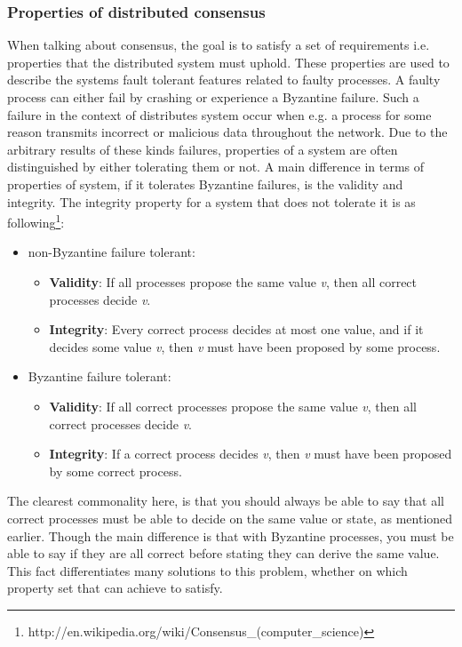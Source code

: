 \subsubsection{Properties of distributed consensus}
When talking about consensus, the goal is to satisfy a set of requirements i.e. properties that the distributed system must uphold. These properties are used to describe the systems fault tolerant features related to faulty processes. A faulty process can either fail by crashing or experience a Byzantine failure. Such a failure in the context of distributes system occur when e.g. a process for some reason transmits incorrect or malicious data throughout the network. Due to the arbitrary results of these kinds failures, properties of a system are often distinguished by either tolerating them or not. A main difference in terms of properties of system, if it tolerates Byzantine failures, is the validity and integrity. The integrity property for a system that does not tolerate it is as following\footnote{http://en.wikipedia.org/wiki/Consensus\_(computer\_science)}:
\begin{itemize}
\item non-Byzantine failure tolerant:
	\begin{itemize}
	\item \textbf{Validity}: If all processes propose the same value \textit{v}, then all correct processes decide \textit{v}.
	\item \textbf{Integrity}: Every correct process decides at most one value, and if it decides some value \textit{v}, then \textit{v} must have been proposed by some process.
	\end{itemize}
\item Byzantine failure tolerant:
	\begin{itemize}
	\item \textbf{Validity}: If all correct processes propose the same value \textit{v}, then all correct processes decide \textit{v}.
	\item \textbf{Integrity}: If a correct process decides \textit{v}, then \textit{v} must have been proposed by some correct process.
	\end{itemize}
\end{itemize}
The clearest commonality here, is that you should always be able to say that all correct processes must be able to decide on the same value or state, as mentioned earlier. Though the main difference is that with Byzantine processes, you must be able to say if they are all correct before stating they can derive the same value. This fact differentiates many solutions to this problem, whether on which property set that can achieve to satisfy.

